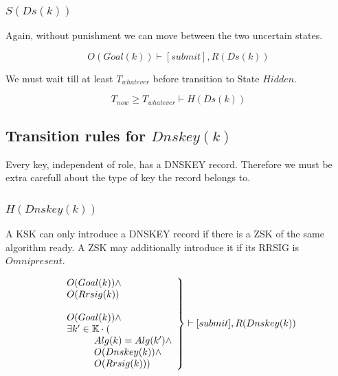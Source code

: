 \documentclass[twoside,english, a4paper]{article}
\newcommand{\mathbox}[1]{#1}
\begin{document}
\subsubsection{$S(Ds(k))$}

\mathbox{

	Again, without punishment we can move between the two uncertain 
	states.

	\begin{equation}
			O(Goal(k)) \vdash [submit], R(Ds(k)) 
	\end{equation}

	We must wait till at least $T_{whatever}$ before transition to State 
	$Hidden$.
	
	\begin{equation}
			T_{now} \geq T_{whatever} \vdash H(Ds(k))
	\end{equation}
}


\subsection{Transition rules for $Dnskey(k)$}

Every key, independent of role, has a DNSKEY record. Therefore we must
be extra carefull about the type of key the record belongs to.

\subsubsection{$H(Dnskey(k))$}

\mathbox{

	A KSK can only introduce a DNSKEY record if there is a ZSK of the
	same algorithm ready. A ZSK may additionally introduce it if its 
	RRSIG is $Omnipresent$.

	\begin{equation}
		\left.
		\begin{array}{l}
			O(Goal(k)) \wedge \\
			O(Rrsig(k)) \\
			\\
			O(Goal(k)) \wedge \\
			\exists k' \in \mathbb{K} \cdot( \\
\hskip 1cm		Alg(k)=Alg(k') \wedge \\
\hskip 1cm		O(Dnskey(k)) \wedge \\
\hskip 1cm		O(Rrsig(k)))\\
		\end{array}
		\right\} \vdash [submit], R(Dnskey(k))
	\end{equation}
}
\end{document}
